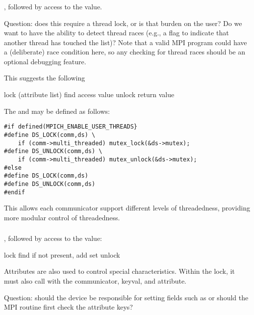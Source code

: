 \documentclass{article}
\begin{document}
\subsubsection{}
\begin{adi3}
, followed by access to the value.

Question: does this require a thread lock, or is that burden on the user?  Do
we want to have the ability to detect thread races (e.g., a flag to indicate
that another thread has touched the list)?  Note that a valid MPI
program could have a (deliberate) race condition here, so any checking
for thread races should be an optional debugging feature.

This suggests the following
\begin{algorithm}
lock (attribute list)
find 
access value
unlock
return value
\end{algorithm}

The  and  may be defined as follows:
\begin{verbatim}
#if defined(MPICH_ENABLE_USER_THREADS}
#define DS_LOCK(comm,ds) \
    if (comm->multi_threaded) mutex_lock(&ds->mutex);
#define DS_UNLOCK(comm,ds) \
    if (comm->multi_threaded) mutex_unlock(&ds->mutex);
#else
#define DS_LOCK(comm,ds)
#define DS_UNLOCK(comm,ds)
#endif
\end{verbatim}
This allows each communicator support different levels of
threadedness, providing more modular control of threadedness.
\end{adi3}

\subsubsection{}
\begin{adi3}
, followed by access to the value:
\begin{algorithm}
lock
find
if not present, add
set
unlock
\end{algorithm}
Attributes are also used to control special characteristics.  Within
the lock, it must also call  with the
communicator, keyval, and attribute.  

Question: should the device be responsible for setting fields such as
 or should the MPI routine first check
the attribute keys?

\end{adi3}
\end{document}
